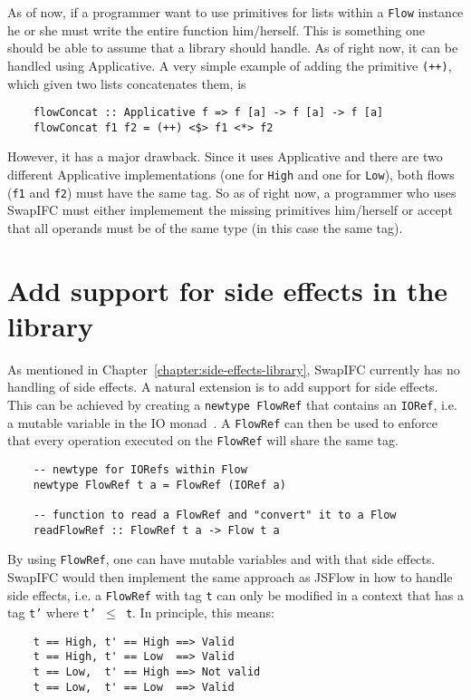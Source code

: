 As of now, if a programmer want to use primitives for lists within a {\tt Flow} instance he or she must write the entire function him/herself. This is something one should be able to assume that a library should handle. As of right now, it can be handled using Applicative. A very simple example of adding the primitive {\tt (++)}, which given two lists concatenates them, is
\begin{verbatim}
    flowConcat :: Applicative f => f [a] -> f [a] -> f [a]
    flowConcat f1 f2 = (++) <$> f1 <*> f2
\end{verbatim}
However, it has a major drawback. Since it uses Applicative and there are two different Applicative implementations (one for {\tt High} and one for {\tt Low}), both flows ({\tt f1} and {\tt f2}) must have the same tag. So as of right now, a programmer who uses SwapIFC must either implemement the missing primitives him/herself or accept that all operands must be of the same type (in this case the same tag).

\section{Add support for side effects in the library}
\label{chapter:future-side-effects}
As mentioned in Chapter~\ref{chapter:side-effects-library}, SwapIFC currently has no handling of side effects. A natural extension is to add support for side effects. This can be achieved by creating a {\tt newtype FlowRef} that contains an {\tt IORef}, i.e. a mutable variable in the IO monad~\cite{ioref}. A {\tt FlowRef} can then be used to enforce that every operation executed on the {\tt FlowRef} will share the same tag.
\begin{verbatim}
    -- newtype for IORefs within Flow
    newtype FlowRef t a = FlowRef (IORef a)

    -- function to read a FlowRef and "convert" it to a Flow
    readFlowRef :: FlowRef t a -> Flow t a
\end{verbatim}
By using {\tt FlowRef}, one can have mutable variables and with that side effects. SwapIFC would then implement the same approach as JSFlow in how to handle side effects, i.e. a {\tt FlowRef} with tag {\tt t} can only be modified in a context that has a tag {\tt t'} where {\tt t' \(\leq\) t}. In principle, this means:
\begin{verbatim}
    t == High, t' == High ==> Valid
    t == High, t' == Low  ==> Valid
    t == Low,  t' == High ==> Not valid
    t == Low,  t' == Low  ==> Valid
\end{verbatim}

